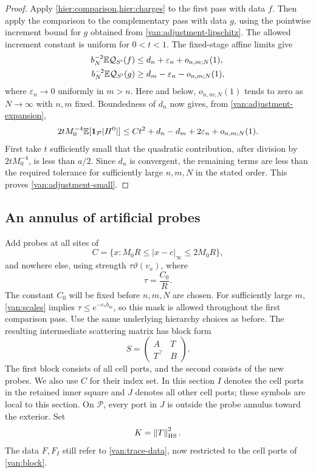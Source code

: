 \begin{proof}
Apply \cref{hier:comparison,hier:charges} to the first pass with data
$f$. Then apply the comparison to the complementary pass with data
$g$, using the pointwise increment bound for $g$ obtained from
\cref{van:adjustment-lipschitz}. The allowed increment constant is
uniform for $0<t<1$. The fixed-stage affine limits give
\begin{align*}
 b_N^{-2}\mathbb E\mathcal Q_{S'}(f)
   &\leq d_n+\varepsilon_n+o_{n,m;N}(1),\\
 b_N^{-2}\mathbb E\mathcal Q_{S'}(g)
   &\geq d_m-\varepsilon_n-o_{n,m;N}(1),
\end{align*}
where $\varepsilon_n\to0$ uniformly in $m>n$. Here and below,
$o_{n,m;N}(1)$ tends to zero as $N\to\infty$ with $n,m$ fixed.
Boundedness of $d_n$ now gives, from
\cref{van:adjustment-expansion},
\begin{equation}\label{van:adjustment-inequality}
 2tM_0^{-4}\mathbb E[\mathbf 1_{\mathcal P}|H^0|]
 \leq Ct^2+d_n-d_m+2\varepsilon_n+o_{n,m;N}(1).
\end{equation}
First take $t$ sufficiently small that the quadratic contribution,
after division by $2tM_0^{-4}$, is less than $a/2$. Since $d_n$ is
convergent, the remaining terms are less than the required tolerance
for sufficiently large $n,m,N$ in the stated order. This proves
\cref{van:adjustment-small}.
\end{proof}

\subsection{An annulus of artificial probes}

Add probes at all sites of
\[
 C=\{x:M_0R\leq |x-c|_\infty\leq 2M_0R\},
\]
and nowhere else, using strength $\tau\vartheta(v_x)$, where
\begin{equation}\label{van:probe-scale}
 \tau=\frac{C_0}{R}.
\end{equation}
The constant $C_0$ will be fixed before $n,m,N$ are chosen. For
sufficiently large $m$, \cref{van:scales} implies
$\tau\leq e^{-c_*b_m}$, so this mask is allowed throughout the first
comparison pass. Use the same underlying hierarchy choices as before.
The resulting intermediate scattering matrix has block form
\begin{equation}\label{van:block}
 S=\begin{pmatrix}A&T\\T^\top&B\end{pmatrix}.
\end{equation}
The first block consists of all cell ports, and the second consists of
the new probes. We also use $C$ for their index set. In this section
$I$ denotes the cell ports in the retained inner square and $J$ denotes
all other cell ports; these symbols are local to this section. On
$\mathcal P$, every port in $J$ is outside the probe annulus toward
the exterior. Set
\[
 K=\left\lVert T\right\rVert_{\mathrm{HS}}^2.
\]
The data $F,F_I$ still refer to \cref{van:trace-data}, now restricted
to the cell ports of \cref{van:block}.

